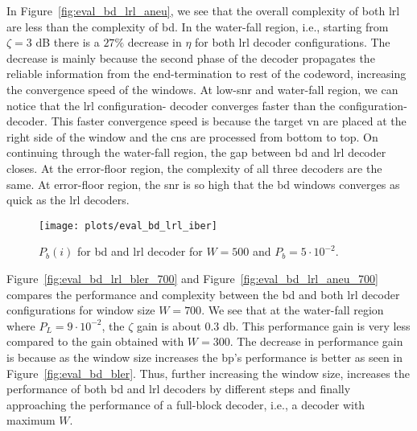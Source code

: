 In Figure~\ref{fig:eval_bd_lrl_aneu}, we see that the overall complexity of both \gls{lrl} are less than the complexity of \gls{bd}. In the water-fall region, i.e., starting from $\zeta=3$ dB there is a $27\%$ decrease in $\eta$ for both \gls{lrl} decoder configurations. The decrease is mainly because the second phase of the decoder propagates the reliable information from the end-termination to rest of the codeword, increasing the convergence speed of the windows. At low-\gls{snr} and water-fall region, we can notice that the \gls{lrl} configuration- decoder converges faster than the configuration- decoder. This faster convergence speed is because the target \gls{vn} are placed at the right side of the window and the \glspl{cn} are processed from bottom to top. On continuing through the water-fall region, the gap between \gls{bd} and \gls{lrl} decoder closes. At the error-floor region, the complexity of all three decoders are the same. At error-floor region, the \gls{snr} is so high that the \gls{bd} windows converges as quick as the \gls{lrl} decoders.
\begin{figure}[htbp]
  \centering
  \texttt{[image: plots/eval\_bd\_lrl\_iber]}
  \caption[Individual \acrshort{ber} of \acrshort{bd} and \acrshort{lrl}.]{$P_b(i)$ for \gls{bd} and \gls{lrl} decoder for $W=500$ and $P_b=5\cdot 10^{-2}$.}
  \label{fig:eval_bd_lrl_iber}
\end{figure}

Figure~\ref{fig:eval_bd_lrl_bler_700} and Figure~\ref{fig:eval_bd_lrl_aneu_700} compares the performance and complexity between the \gls{bd} and both \gls{lrl} decoder configurations for window size $W=700$. We see that at the water-fall region where $P_L=9\cdot 10^{-2}$, the $\zeta$ gain is about $0.3$ db. This performance gain is very less compared to the gain obtained with $W=300$. The decrease in performance gain is because as the window size increases the \gls{bp}'s performance is better as seen in Figure~\ref{fig:eval_bd_bler}. Thus, further increasing the window size, increases the performance of both \gls{bd} and \gls{lrl} decoders by different steps and finally approaching the performance of a full-block decoder, i.e., a decoder with maximum $W$.

